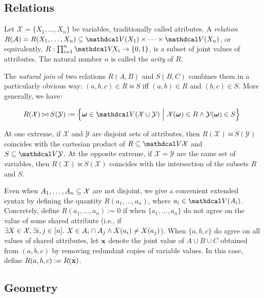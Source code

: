 \begin{subappendices}
\subsection{Relations}

Let $\mathcal X = \{ X_1, \ldots, X_n \}$ be variables, traditionally called atributes. 
A \emph{relation} $R(\mathcal A) = R(X_1, \ldots, X_n) \subseteq 
\V(X_1) \times \cdots \times \V(X_n)$, or equivalently, $R : \prod_{i=1}^n \V\!X_i \to \{0,1\}$, is a subset of joint values of attributes. 
The natural number $n$ is called the \emph{arity} of $R$. 


The \emph{natural join} of two relations $R(A,B)$ and $S(B,C)$ combines them in a particularly obvious way: $(a,b,c) \in R \bowtie S$ iff $(a,b) \in R$ and $(b,c) \in S$. 
More generally, we have: 

\begin{equation}
    R(\mathcal X) \bowtie S(\mathcal Y)
        := 
        \Big\{
            \boldsymbol\omega \in  \V(\mathcal X \cup \mathcal Y)
            ~\Big|~
            \mathcal X(\boldsymbol\omega) \in R \land
            \mathcal Y(\boldsymbol\omega) \in S
        \Big\}
\end{equation}

At one extreme, if $\mathcal X$ and $\mathcal Y$ are disjoint sets of attributes, then $R(\mathcal X) \bowtie S(\mathcal Y)$ coincides with the cartesian product of $R \subseteq \V \mathcal X$ and $S \subseteq \V\mathcal Y$.
At the opposite extreme, if $\mathcal X = \mathcal Y$ are the same set of variables, then $R(\mathcal X) \bowtie S(\mathcal X)$ coincides with the intersection of the subsets $R$ and $S$. 

Even when $A_1, \ldots, A_n \subseteq \mathcal X$ are not disjoint, we give a convenient extended syntax by defining the quantity $R(a_1, \ldots, a_n)$, where $a_i \in \V(A_i)$. 
Concretely, define $R(a_1,\ldots, a_n) := 0$ if when $\{a_1, \ldots, a_n\}$ do not agree on the value of some shared attribute (i.e., if $\exists X \in \mathcal X, \exists i,j \in [n]. ~X \in A_i \cap A_j \land X(a_i) \ne X(a_j)$).
When $\{a,b,c\}$ do agree on all values of shared attributes, let $\mathbf x$ denote the joint value of $A \cup B \cup C$ obtained from $(a,b,c)$ by removing redundant copies of variable values.
In this case, define $R(a,b,c) := R(\mathbf x)$. 


\subsection{Geometry}

    
\end{subappendices}
